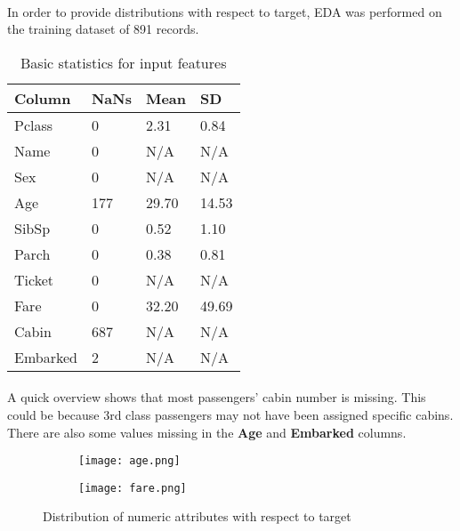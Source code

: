 \documentclass{article}
\begin{document}
\paragraph{}In order to provide distributions with respect to target, EDA was performed on the training dataset of 891 records.
\begin{table}[htb]
\centering
\begin{tabular}{|l|l|l|l|}
\hline
\textbf{Column} & \textbf{NaNs} & \textbf{Mean} & \textbf{SD} \\ \hline
Pclass          & 0             & 2.31          & 0.84         \\ \hline
Name            & 0             & N/A           & N/A          \\ \hline
Sex             & 0             & N/A           & N/A          \\ \hline
Age             & 177           & 29.70         & 14.53        \\ \hline
SibSp           & 0             & 0.52          & 1.10         \\ \hline
Parch           & 0             & 0.38          & 0.81         \\ \hline
Ticket          & 0             & N/A           & N/A          \\ \hline
Fare            & 0             & 32.20         & 49.69        \\ \hline
Cabin           & 687           & N/A           & N/A          \\ \hline
Embarked        & 2             & N/A           & N/A          \\ \hline
\end{tabular}
\caption{Basic statistics for input features}
\end{table}
\paragraph{} A quick overview shows that most passengers' cabin number is missing. This could be because 3rd class passengers may not have been assigned specific cabins. There are also some values missing in the \textbf{Age} and \textbf{Embarked} columns.
\begin{figure}[htb]
    \centering
    \begin{subfigure}
        \centering
        \texttt{[image: age.png]}
    \end{subfigure}
    \begin{subfigure}
        \centering
        \texttt{[image: fare.png]}
    \end{subfigure}
    \caption{Distribution of numeric attributes with respect to target}
    \label{fig:enter-label}
\end{figure}
\end{document}
